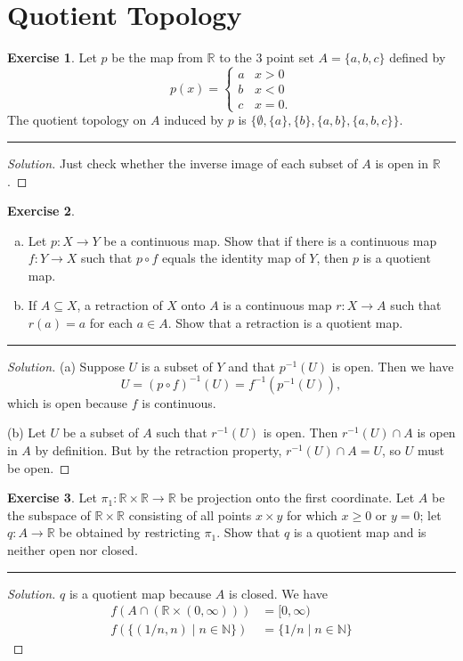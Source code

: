\documentclass{article}
\theoremstyle{definition}
\newtheorem{exercise}{Exercise}[section]
\begin{document}
\addtocounter{section}{21}
\section{Quotient Topology}

\begin{exercise}
  Let $p$ be the map from $\mathbb{R}$ to the 3 point set $A = \{a,b,c\}$ defined by
  $$p(x) = \begin{cases}
    a & x > 0 \\
    b & x < 0 \\
    c & x = 0.
  \end{cases}$$
  The quotient topology on $A$ induced by $p$ is $\{\emptyset, \{a\}, \{b\}, \{a,b\}, \{a,b,c\}\}$.
\end{exercise}
\hrule
\begin{proof}[Solution]
  Just check whether the inverse image of each subset of $A$ is open in $\mathbb{R}$.
\end{proof}

\pagebreak

\begin{exercise}
  \begin{enumerate}[(a)]
    \item Let $p:X\to Y$ be a continuous map. Show that if there is a continuous map $f:Y\to X$ such that $p\circ f$ equals the identity map of $Y$, then $p$ is a quotient map.
    \item If $A\subseteq X$, a retraction of $X$ onto $A$ is a continuous map $r:X\to A$ such that $r(a) = a$ for each $a\in A$. Show that a retraction is a quotient map.
  \end{enumerate}
\end{exercise}
\hrule
\begin{proof}[Solution]
  (a) Suppose $U$ is a subset of $Y$ and that $p^{-1}(U)$ is open. Then we have
  $$U = (p\circ f)^{-1}(U) = f^{-1}(p^{-1}(U)),$$
  which is open because $f$ is continuous.

  (b) Let $U$ be a subset of $A$ such that $r^{-1}(U)$ is open. Then $r^{-1}(U)\cap A$ is open in $A$ by definition. But by the retraction property, $r^{-1}(U)\cap A = U$, so $U$ must be open.
\end{proof}

\pagebreak

\begin{exercise}
  Let $\pi_1:\mathbb{R}\times \mathbb{R}\to\mathbb{R}$ be projection onto the first coordinate. Let $A$ be the subspace of $\mathbb{R}\times\mathbb{R}$ consisting of all points $x\times y$ for which $x\ge 0$ or $y = 0$; let $q:A\to\mathbb{R}$ be obtained by restricting $\pi_1$. Show that $q$ is a quotient map and is neither open nor closed.
\end{exercise}
\hrule
\begin{proof}[Solution]
  $q$ is a quotient map because $A$ is closed. We have
  \begin{align*}
    f(A\cap(\mathbb{R}\times (0,\infty))) &= [0,\infty) \\
    f(\{(1/n,n)\mid n\in\mathbb{N}\}) &= \{1/n\mid n\in\mathbb{N}\}
  \end{align*}
\end{proof}
\end{document}
